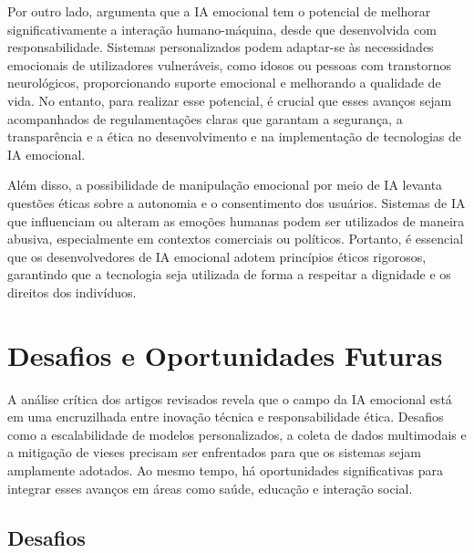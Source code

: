 \documentclass[a4paper,12pt]{report}
\begin{document}
	Por outro lado, \textcite{picard1997} argumenta que a IA emocional tem o potencial de melhorar significativamente a interação humano-máquina, desde que desenvolvida com responsabilidade. Sistemas personalizados podem adaptar-se às necessidades emocionais de utilizadores vulneráveis, como idosos ou pessoas com transtornos neurológicos, proporcionando suporte emocional e melhorando a qualidade de vida. No entanto, para realizar esse potencial, é crucial que esses avanços sejam acompanhados de regulamentações claras que garantam a segurança, a transparência e a ética no desenvolvimento e na implementação de tecnologias de IA emocional.
	
	Além disso, a possibilidade de manipulação emocional por meio de IA levanta questões éticas sobre a autonomia e o consentimento dos usuários. Sistemas de IA que influenciam ou alteram as emoções humanas podem ser utilizados de maneira abusiva, especialmente em contextos comerciais ou políticos. Portanto, é essencial que os desenvolvedores de IA emocional adotem princípios éticos rigorosos, garantindo que a tecnologia seja utilizada de forma a respeitar a dignidade e os direitos dos indivíduos.
	
	
	\section{Desafios e Oportunidades Futuras}
	
	A análise crítica dos artigos revisados revela que o campo da IA emocional está em uma encruzilhada entre inovação técnica e responsabilidade ética. Desafios como a escalabilidade de modelos personalizados, a coleta de dados multimodais e a mitigação de vieses precisam ser enfrentados para que os sistemas sejam amplamente adotados. Ao mesmo tempo, há oportunidades significativas para integrar esses avanços em áreas como saúde, educação e interação social.
	
	\subsection{Desafios}
	
\end{document}
